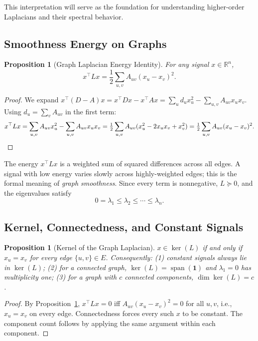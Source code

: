 \documentclass[11pt]{article}
\newtheorem{proposition}[theorem]{Proposition}
\theoremstyle{definition}
\theoremstyle{remark}
\newcommand{\R}{\mathbb{R}}
\DeclareMathOperator{\spn}{span}
\begin{document}
This interpretation will serve as the foundation for understanding higher-order Laplacians and their spectral behavior.

\subsection{Smoothness Energy on Graphs}

\begin{proposition}[Graph Laplacian Energy Identity]
\label{prop:graph_energy}
For any signal $x \in \R^n$,
\[
  x^\top L x = \frac{1}{2} \sum_{u,v} A_{uv}(x_u - x_v)^2.
\]
\end{proposition}

\begin{proof}
We expand $x^\top(D-A)x = x^\top Dx - x^\top Ax = \sum_u d_u x_u^2 -
\sum_{u,v}A_{uv}x_u x_v$. Using $d_u = \sum_v A_{uv}$ in the first term:
\[
  x^\top Lx = \sum_{u,v}A_{uv}x_u^2 - \sum_{u,v}A_{uv}x_u x_v
  = \tfrac{1}{2}\sum_{u,v}A_{uv}(x_u^2 - 2x_u x_v + x_v^2)
  = \tfrac{1}{2}\sum_{u,v}A_{uv}(x_u-x_v)^2. \qedhere
\]
\end{proof}

The energy $x^\top Lx$ is a weighted sum of squared differences across all
edges. A signal with low energy varies slowly across highly-weighted edges; this
is the formal meaning of \emph{graph smoothness}. Since every term is
nonnegative, $L\succeq 0$, and the eigenvalues satisfy
\[
  0 = \lambda_1 \leq \lambda_2 \leq \cdots \leq \lambda_n.
\]

\subsection{Kernel, Connectedness, and Constant Signals}

\begin{proposition}[Kernel of the Graph Laplacian]
\label{prop:graph_kernel}
$x \in \ker(L)$ if and only if $x_u = x_v$ for every edge $\{u,v\}\in E$.
Consequently: (1) constant signals always lie in $\ker(L)$; (2) for a
connected graph, $\ker(L) = \spn(\mathbf{1})$ and $\lambda_1=0$ has multiplicity
one; (3) for a graph with $c$ connected components, $\dim\ker(L) = c$.
\end{proposition}

\begin{proof}
By Proposition~\ref{prop:graph_energy}, $x^\top Lx = 0$ iff $A_{uv}(x_u-x_v)^2
= 0$ for all $u,v$, i.e., $x_u = x_v$ on every edge. Connectedness forces
every such $x$ to be constant. The component count follows by applying the
same argument within each component.
\end{proof}
\end{document}
